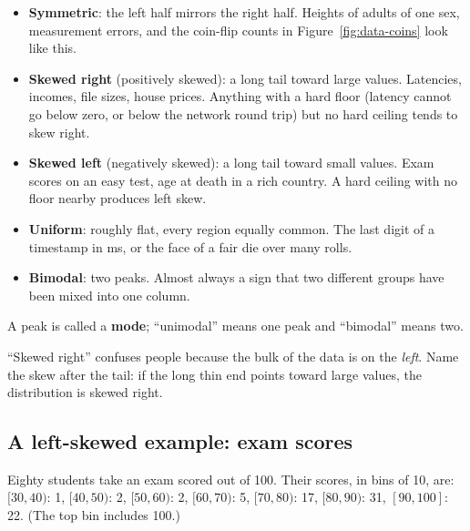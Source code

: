 \begin{itemize}
  \item \textbf{Symmetric}: the left half mirrors the right half. Heights of adults of one sex,
  measurement errors, and the coin-flip counts in Figure~\ref{fig:data-coins} look like this.
  \item \textbf{Skewed right} (positively skewed): a long tail toward large values. Latencies,
  incomes, file sizes, house prices. Anything with a hard floor (latency cannot go below
  zero, or below the network round trip) but no hard ceiling tends to skew right.
  \item \textbf{Skewed left} (negatively skewed): a long tail toward small values. Exam scores
  on an easy test, age at death in a rich country. A hard ceiling with no floor nearby produces
  left skew.
  \item \textbf{Uniform}: roughly flat, every region equally common. The last digit of a
  timestamp in ms, or the face of a fair die over many rolls.
  \item \textbf{Bimodal}: two peaks. Almost always a sign that two different groups have been
  mixed into one column.
\end{itemize}

A peak is called a \textbf{mode}; ``unimodal'' means one peak and ``bimodal'' means two.

\begin{trapbox}
``Skewed right'' confuses people because the bulk of the data is on the \emph{left}. Name the
skew after the tail: if the long thin end points toward large values, the distribution is
skewed right.
\end{trapbox}

\subsection{A left-skewed example: exam scores}

Eighty students take an exam scored out of 100. Their scores, in bins of 10, are:
$[30,40)$: 1, $[40,50)$: 2, $[50,60)$: 2, $[60,70)$: 5, $[70,80)$: 17, $[80,90)$: 31,
$[90,100]$: 22. (The top bin includes 100.)

